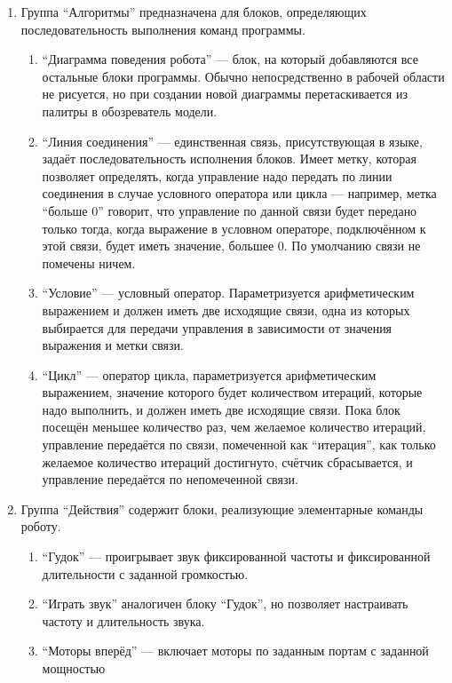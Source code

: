 \begin{enumerate}
	\item Группа "`Алгоритмы"' предназначена для блоков, определяющих последовательность 
		выполнения команд программы.
		\begin{enumerate}
			\item "`Диаграмма поведения робота"' --- блок, на который добавляются все остальные 
				блоки программы. Обычно непосредственно в рабочей области не рисуется, но 
				при создании новой диаграммы перетаскивается из палитры в обозреватель модели.
			\item "`Линия соединения"' --- единственная связь, присутствующая в языке, задаёт 
				последовательность исполнения блоков. Имеет метку, которая позволяет определять, 
				когда управление надо передать по линии соединения в случае условного оператора 
				или цикла --- например, метка "`больше 0"' говорит, что управление по данной 
				связи будет передано только тогда, когда выражение в условном операторе, подключённом 
				к этой связи, будет иметь значение, большее 0. По умолчанию связи не помечены ничем.
			\item "`Условие"' --- условный оператор. Параметризуется арифметическим выражением 
				и должен иметь две исходящие связи, одна из которых выбирается для передачи 
				управления в зависимости от значения выражения и метки связи.
			\item "`Цикл"' --- оператор цикла, параметризуется арифметическим выражением, 
				значение которого будет количеством итераций, которые надо выполнить, и должен 
				иметь две исходящие связи. Пока блок посещён меньшее количество раз, чем желаемое 
				количество итераций, управление передаётся по связи, помеченной как "`итерация"', 
				как только желаемое количество итераций достигнуто, счётчик сбрасывается, и 
				управление передаётся по непомеченной связи.
		\end{enumerate}
	\item Группа "`Действия"' содержит блоки, реализующие элементарные команды роботу.
		\begin{enumerate}
			\item "`Гудок"' --- проигрывает звук фиксированной частоты и фиксированной длительности 
				с заданной громкостью.
			\item "`Играть звук"' аналогичен блоку "`Гудок"', но позволяет настраивать частоту 
				и длительность звука.
			\item "`Моторы вперёд"' --- включает моторы по заданным портам с заданной мощностью 

\end{enumerate}
\end{enumerate}

